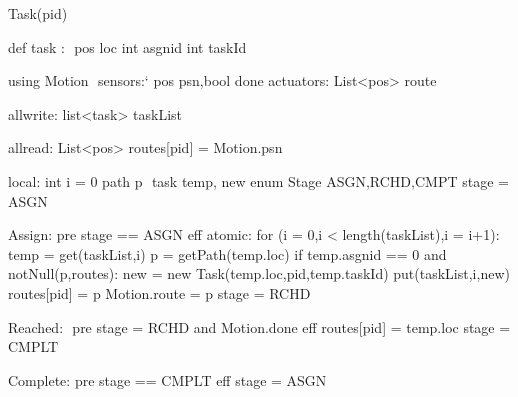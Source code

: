 Task(pid)

def task : $\label{taskdef}$
    pos loc
    int asgnid
    int taskId

using Motion $\label{moddef}$
    sensors:`
       pos psn,bool done
    actuators:
       List<pos> route

allwrite:$\label{awvar}$
   list<task> taskList
 
allread:$\label{arvar}$
   List<pos> routes[pid] = Motion.psn

local:
   int i = 0 
   path p $\label{pathvar}$
   task temp, new
   enum Stage {ASGN,RCHD,CMPT} stage
                             = ASGN
   
Assign:$\label{asgnevent}$
  pre stage == ASGN
  eff atomic:
    for (i = 0,i < length(taskList),i = i+1):
        temp = get(taskList,i)
        p = getPath(temp.loc)
        if temp.asgnid == 0 and notNull(p,routes):
           new = new Task(temp.loc,pid,temp.taskId)
           put(taskList,i,new)
           routes[pid] = p
           Motion.route = p 
           stage = RCHD          
   
Reached: $\label{rchevent}$
  pre stage = RCHD and Motion.done
  eff routes[pid] = temp.loc
      stage = CMPLT

Complete:$\label{cmpltevent}$
  pre stage == CMPLT
  eff stage = ASGN